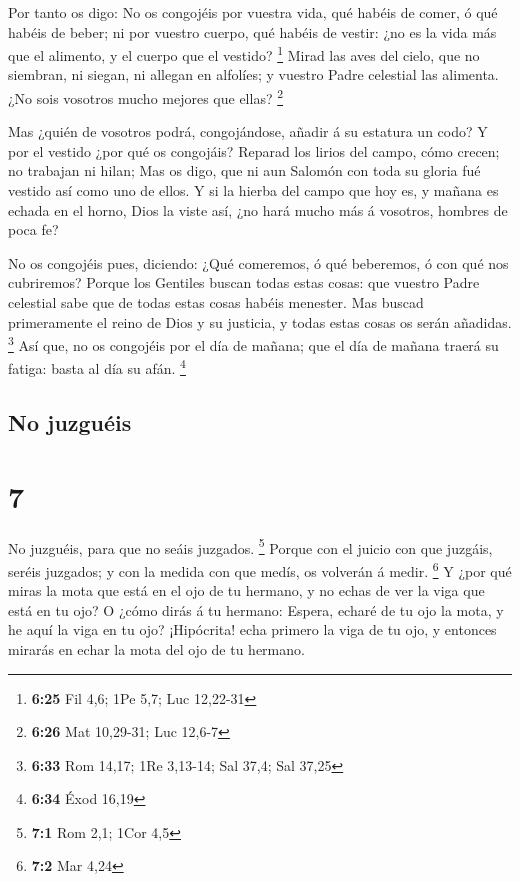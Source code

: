  Por tanto os digo: No os congojéis por vuestra vida, qué
habéis de comer, ó qué habéis de beber; ni por vuestro cuerpo, qué
habéis de vestir: ¿no es la vida más que el alimento, y el cuerpo que el
vestido? \footnote{\textbf{6:25} Fil 4,6; 1Pe 5,7; Luc 12,22-31}
 Mirad las aves del cielo, que no siembran, ni siegan, ni
allegan en alfolíes; y vuestro Padre celestial las alimenta. ¿No sois
vosotros mucho mejores que ellas? \footnote{\textbf{6:26} Mat 10,29-31;
  Luc 12,6-7}

 Mas ¿quién de vosotros podrá, congojándose, añadir á su
estatura un codo?  Y por el vestido ¿por qué os congojáis?
Reparad los lirios del campo, cómo crecen; no trabajan ni hilan;
 Mas os digo, que ni aun Salomón con toda su gloria fué
vestido así como uno de ellos.  Y si la hierba del campo
que hoy es, y mañana es echada en el horno, Dios la viste así, ¿no hará
mucho más á vosotros, hombres de poca fe?

 No os congojéis pues, diciendo: ¿Qué comeremos, ó qué
beberemos, ó con qué nos cubriremos?  Porque los Gentiles
buscan todas estas cosas: que vuestro Padre celestial sabe que de todas
estas cosas habéis menester.  Mas buscad primeramente el
reino de Dios y su justicia, y todas estas cosas os serán añadidas.
\footnote{\textbf{6:33} Rom 14,17; 1Re 3,13-14; Sal 37,4; Sal 37,25}
 Así que, no os congojéis por el día de mañana; que el día
de mañana traerá su fatiga: basta al día su afán. \footnote{\textbf{6:34}
  Éxod 16,19}

\hypertarget{no-juzguuxe9is}{%
\subsection{No juzguéis}\label{no-juzguuxe9is}}

\hypertarget{section-6}{%
\section{7}\label{section-6}}

 No juzguéis, para que no seáis juzgados. \footnote{\textbf{7:1}
  Rom 2,1; 1Cor 4,5}  Porque con el juicio con que juzgáis,
seréis juzgados; y con la medida con que medís, os volverán á medir.
\footnote{\textbf{7:2} Mar 4,24}  Y ¿por qué miras la mota
que está en el ojo de tu hermano, y no echas de ver la viga que está en
tu ojo?  O ¿cómo dirás á tu hermano: Espera, echaré de tu
ojo la mota, y he aquí la viga en tu ojo?  ¡Hipócrita! echa
primero la viga de tu ojo, y entonces mirarás en echar la mota del ojo
de tu hermano.

